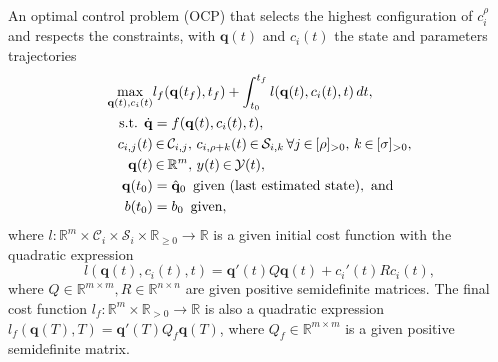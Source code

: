 \documentclass[letterpaper,10pt,journal,twoside]{IEEEtran}
\theoremstyle{definition}
\begin{document}
An optimal control problem (OCP) that selects the highest configuration of {\color{blue} $c_i^\rho$} and respects the constraints, with $\mathbf{q}(t)$ and $c_i(t)$ the state and parameters trajectories
\begin{subequations}\label{eq:ocp-output-mpc}\begin{align}
  \max_{\mathbf{q}(t),c_i(t)}&{l_f(\mathbf{q}(t_f),t_f)+\int_{t_0}^{t_f}{l(\mathbf{q}(t),c_i(t),t)\,dt}},\label{eq:ocp-costs}\\
  \text{s.t. }\dot{\mathbf{q}}&=f(\mathbf{q}(t),c_i(t),t),\label{eq:dyn-evol}\\
  c_{i,j}(t)&\hspace*{-.2ex}\in\hspace*{-.2ex}\mathcal{C}_{i,j},\,c_{i,\rho+k}(t)\hspace*{-.2ex}\in\hspace*{-.2ex}\mathcal{S}_{i,k}\,\forall j\hspace*{-.2ex}\in\hspace*{-.2ex}[\rho]_{>0},\,k\hspace*{-.2ex}\in\hspace*{-.2ex}[\sigma]_{>0},\label{eq:state-cont-const-mpc}\\
  \mathbf{q}(t)&\hspace*{-.2ex}\in\hspace*{-.2ex}\mathbb{R}^m,\,y(t)\hspace*{-.2ex}\in\hspace*{-.2ex}\mathcal{Y}(t),\label{eq:batt-const-mpc}\\
  \mathbf{q}(t_0)&=\hat{\mathbf{q}}_0\,\,\,\text{given (last estimated state)},\text{ and}\label{eq:ocp-outp-mpc-state-est}\\
  b(t_0)&=b_0\,\,\,\text{given}\label{eq:ocp-outp-bat},
\end{align}\end{subequations}
where $l:\mathbb{R}^m\times\mathcal{C}_i\times\mathcal{S}_i\times\mathbb{R}_{\geq 0}\rightarrow\mathbb{R}$ is a given initial cost function with the quadratic expression
\begin{equation}\label{eq:insta-cost-mpc}
  l(\mathbf{q}(t),c_i(t),t)=\mathbf{q}'(t)Q\mathbf{q}(t)+c_i'(t)Rc_i(t),
\end{equation}
where $Q\in\mathbb{R}^{m\times m},R\in\mathbb{R}^{n\times n}$ are given positive semidefinite matrices.%
The final cost function $l_f:\mathbb{R}^m\times\mathbb{R}_{> 0}\rightarrow\mathbb{R}$ is also a quadratic expression %
  $l_f(\mathbf{q}(T),T)=\mathbf{q}'(T)Q_f\mathbf{q}(T)$, 
where $Q_f\in\mathbb{R}^{m\times m}$ is a given positive semidefinite matrix.
\end{document}
